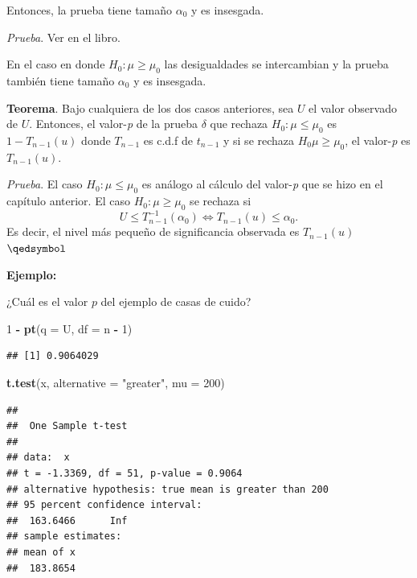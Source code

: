 \documentclass[
  12pt,
]{book}
\newenvironment{Shaded}{\begin{snugshade}}{\end{snugshade}}
\newcommand{\DataTypeTok}[1]{\textcolor[rgb]{0.13,0.29,0.53}{#1}}
\newcommand{\DecValTok}[1]{\textcolor[rgb]{0.00,0.00,0.81}{#1}}
\newcommand{\KeywordTok}[1]{\textcolor[rgb]{0.13,0.29,0.53}{\textbf{#1}}}
\newcommand{\NormalTok}[1]{#1}
\newcommand{\OperatorTok}[1]{\textcolor[rgb]{0.81,0.36,0.00}{\textbf{#1}}}
\newcommand{\StringTok}[1]{\textcolor[rgb]{0.31,0.60,0.02}{#1}}
\begin{document}
Entonces, la prueba tiene tamaño \(\alpha_0\) y es insesgada.

\emph{Prueba}. Ver en el libro.

En el caso en donde \(H_0:\mu\geq \mu_0\) las desigualdades se intercambian y la
prueba también tiene tamaño \(\alpha_0\) y es insesgada.

\textbf{Teorema}. Bajo cualquiera de los dos casos anteriores, sea \(U\) el valor
observado de \(U\). Entonces, el valor-\emph{p} de la prueba \(\delta\) que rechaza \(H_0: \mu\leq\mu_0\) es \(1-T_{n-1}(u)\) donde \(T_{n-1}\) es c.d.f de \(t_{n-1}\) y si se
rechaza \(H_0 \mu\geq \mu_0\), el valor-\emph{p} es \(T_{n-1}(u)\).

\emph{Prueba}. El caso \(H_0:\mu\leq\mu_0\) es análogo al cálculo del valor-\emph{p} que se
hizo en el capítulo anterior. El caso \(H_0: \mu\geq \mu_0\) se rechaza si \[U\leq
T_{n-1}^{-1}(\alpha_0) \Leftrightarrow T_{n-1}(u)\leq \alpha_0.\] Es decir, el
nivel más pequeño de significancia observada es \(T_{n-1}(u)\) \(\qedsymbol\)

\textbf{Ejemplo:}

¿Cuál es el valor \(p\) del ejemplo de casas de cuido?

\begin{Shaded}
\begin{Highlighting}[]
\DecValTok{1} \OperatorTok{{-}}\StringTok{ }\KeywordTok{pt}\NormalTok{(}\DataTypeTok{q =}\NormalTok{ U, }\DataTypeTok{df =}\NormalTok{ n }\OperatorTok{{-}}\StringTok{ }\DecValTok{1}\NormalTok{)}
\end{Highlighting}
\end{Shaded}

\begin{verbatim}
## [1] 0.9064029
\end{verbatim}

\begin{Shaded}
\begin{Highlighting}[]
\KeywordTok{t.test}\NormalTok{(x, }\DataTypeTok{alternative =} \StringTok{"greater"}\NormalTok{, }\DataTypeTok{mu =} \DecValTok{200}\NormalTok{)}
\end{Highlighting}
\end{Shaded}

\begin{verbatim}
## 
##  One Sample t-test
## 
## data:  x
## t = -1.3369, df = 51, p-value = 0.9064
## alternative hypothesis: true mean is greater than 200
## 95 percent confidence interval:
##  163.6466      Inf
## sample estimates:
## mean of x 
##  183.8654
\end{verbatim}
\end{document}
